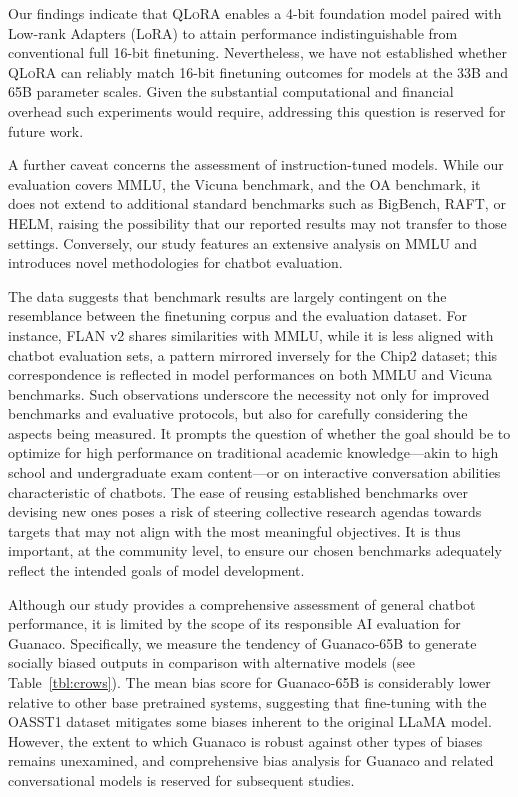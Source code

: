 Our findings indicate that \textsc{QLoRA} enables a 4-bit foundation model paired with Low-rank Adapters (LoRA) to attain performance indistinguishable from conventional full 16-bit finetuning. Nevertheless, we have not established whether \textsc{QLoRA} can reliably match 16-bit finetuning outcomes for models at the 33B and 65B parameter scales. Given the substantial computational and financial overhead such experiments would require, addressing this question is reserved for future work.

A further caveat concerns the assessment of instruction-tuned models. While our evaluation covers MMLU, the Vicuna benchmark, and the OA benchmark, it does not extend to additional standard benchmarks such as BigBench, RAFT, or HELM, raising the possibility that our reported results may not transfer to those settings. Conversely, our study features an extensive analysis on MMLU and introduces novel methodologies for chatbot evaluation.

The data suggests that benchmark results are largely contingent on the resemblance between the finetuning corpus and the evaluation dataset. For instance, FLAN v2 shares similarities with MMLU, while it is less aligned with chatbot evaluation sets, a pattern mirrored inversely for the Chip2 dataset; this correspondence is reflected in model performances on both MMLU and Vicuna benchmarks. Such observations underscore the necessity not only for improved benchmarks and evaluative protocols, but also for carefully considering the aspects being measured. It prompts the question of whether the goal should be to optimize for high performance on traditional academic knowledge—akin to high school and undergraduate exam content—or on interactive conversation abilities characteristic of chatbots. The ease of reusing established benchmarks over devising new ones poses a risk of steering collective research agendas towards targets that may not align with the most meaningful objectives. It is thus important, at the community level, to ensure our chosen benchmarks adequately reflect the intended goals of model development.

Although our study provides a comprehensive assessment of general chatbot performance, it is limited by the scope of its responsible AI evaluation for {Guanaco}. Specifically, we measure the tendency of {Guanaco}-65B to generate socially biased outputs in comparison with alternative models (see Table~\ref{tbl:crows}). The mean bias score for {Guanaco}-65B is considerably lower relative to other base pretrained systems, suggesting that fine-tuning with the OASST1 dataset mitigates some biases inherent to the original LLaMA model. However, the extent to which {Guanaco} is robust against other types of biases remains unexamined, and comprehensive bias analysis for {Guanaco} and related conversational models is reserved for subsequent studies.

